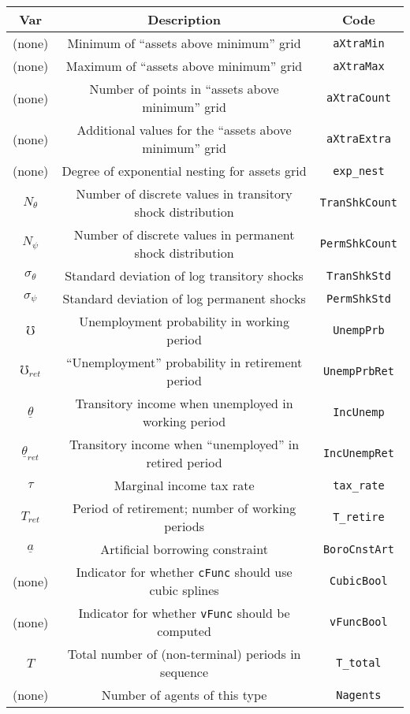 \documentclass[12pt,titlepage,letterpaper]{econtex}
\begin{document}
\begin{table}[h!]
\centering
\begin{tabular}{c c c}
Var & Description & Code \\
\hline
(none) & Minimum of ``assets above minimum'' grid & \texttt{aXtraMin} \\
(none) & Maximum of ``assets above minimum'' grid & \texttt{aXtraMax} \\
(none) & Number of points in ``assets above minimum'' grid & \texttt{aXtraCount} \\
(none) & Additional values for the ``assets above minimum'' grid & \texttt{aXtraExtra} \\
(none) & Degree of exponential nesting for assets grid & \texttt{exp\_nest} \\
$N_{\theta}$ & Number of discrete values in transitory shock distribution & \texttt{TranShkCount} \\
$N_{\psi}$ & Number of discrete values in permanent shock distribution & \texttt{PermShkCount} \\
$\sigma_\theta$ & Standard deviation of log transitory shocks & \texttt{TranShkStd} \\
$\sigma_\psi$ & Standard deviation of log permanent shocks & \texttt{PermShkStd} \\
$\mho$ & Unemployment probability in working period & \texttt{UnempPrb} \\
$\mho_{ret}$ & ``Unemployment'' probability in retirement period & \texttt{UnempPrbRet} \\
$\underline{\theta}$ & Transitory income when unemployed in working period & \texttt{IncUnemp} \\
$\underline{\theta}_{ret}$ & Transitory income when ``unemployed'' in retired period & \texttt{IncUnempRet} \\
$\tau$ & Marginal income tax rate & \texttt{tax\_rate} \\
$T_{ret}$ & Period of retirement; number of working periods & \texttt{T\_retire} \\
$\underline{a}$ & Artificial borrowing constraint & \texttt{BoroCnstArt} \\
(none) & Indicator for whether \texttt{cFunc} should use cubic splines & \texttt{CubicBool} \\
(none) & Indicator for whether \texttt{vFunc} should be computed & \texttt{vFuncBool} \\
$T$ & Total number of (non-terminal) periods in sequence & \texttt{T\_total} \\
(none) & Number of agents of this type & \texttt{Nagents}
\end{tabular}
\end{table}
\end{document}
